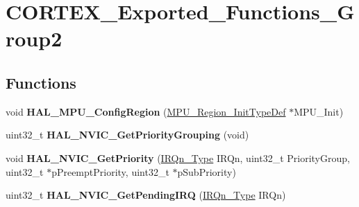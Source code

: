 \hypertarget{group___c_o_r_t_e_x___exported___functions___group2}{}\section{C\+O\+R\+T\+E\+X\+\_\+\+Exported\+\_\+\+Functions\+\_\+\+Group2}
\label{group___c_o_r_t_e_x___exported___functions___group2}
\subsection*{Functions}
\begin{DoxyCompactItemize}
\item 
void {\bfseries H\+A\+L\+\_\+\+M\+P\+U\+\_\+\+Config\+Region} (\hyperlink{struct_m_p_u___region___init_type_def}{M\+P\+U\+\_\+\+Region\+\_\+\+Init\+Type\+Def} $\ast$M\+P\+U\+\_\+\+Init)\hypertarget{group___c_o_r_t_e_x___exported___functions___group2_ga4d8e28f38296dad16c1f6c4bf8c310d5}{}\label{group___c_o_r_t_e_x___exported___functions___group2_ga4d8e28f38296dad16c1f6c4bf8c310d5}

\item 
uint32\+\_\+t {\bfseries H\+A\+L\+\_\+\+N\+V\+I\+C\+\_\+\+Get\+Priority\+Grouping} (void)\hypertarget{group___c_o_r_t_e_x___exported___functions___group2_gaa02bc953fd4fce22248c491a93c4ce40}{}\label{group___c_o_r_t_e_x___exported___functions___group2_gaa02bc953fd4fce22248c491a93c4ce40}

\item 
void {\bfseries H\+A\+L\+\_\+\+N\+V\+I\+C\+\_\+\+Get\+Priority} (\hyperlink{group___peripheral__interrupt__number__definition_ga7e1129cd8a196f4284d41db3e82ad5c8}{I\+R\+Qn\+\_\+\+Type} I\+R\+Qn, uint32\+\_\+t Priority\+Group, uint32\+\_\+t $\ast$p\+Preempt\+Priority, uint32\+\_\+t $\ast$p\+Sub\+Priority)\hypertarget{group___c_o_r_t_e_x___exported___functions___group2_ga6a21c9d904b0bcf4cb060f7c5c39b6f5}{}\label{group___c_o_r_t_e_x___exported___functions___group2_ga6a21c9d904b0bcf4cb060f7c5c39b6f5}

\item 
uint32\+\_\+t {\bfseries H\+A\+L\+\_\+\+N\+V\+I\+C\+\_\+\+Get\+Pending\+I\+RQ} (\hyperlink{group___peripheral__interrupt__number__definition_ga7e1129cd8a196f4284d41db3e82ad5c8}{I\+R\+Qn\+\_\+\+Type} I\+R\+Qn)\hypertarget{group___c_o_r_t_e_x___exported___functions___group2_ga3bd5802a96f0dcbc00ac3b89b134da3b}{}\label{group___c_o_r_t_e_x___exported___functions___group2_ga3bd5802a96f0dcbc00ac3b89b134da3b}


\end{DoxyCompactItemize}
